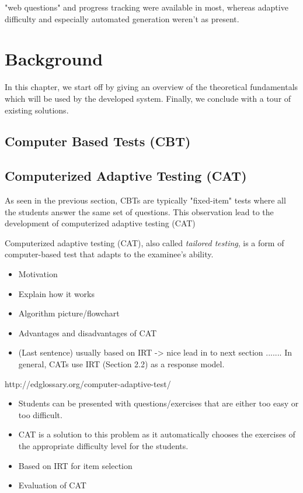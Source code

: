 \documentclass[11pt,a4paper]{report}
\begin{document}
 
"web questions" and progress tracking were available in most, whereas adaptive difficulty and especially automated generation weren't as present. 



\chapter{Background}
In this chapter, we start off by giving an overview of the theoretical fundamentals which will be used by the developed system. Finally, we conclude with a tour of existing solutions.

\section{Computer Based Tests (CBT)}

\section{Computerized Adaptive Testing (CAT)}
As seen in the previous section, CBTs are typically "fixed-item" tests where all the students answer the same set of questions.  This observation lead to the development of computerized adaptive testing (CAT)

Computerized adaptive testing (CAT), also called \textit{tailored testing}, is a form of computer-based test that adapts to the examinee's ability.

\begin{itemize}
\item Motivation
\item Explain how it works
\item Algorithm picture/flowchart
\item Advantages and disadvantages of CAT
\item (Last sentence) usually based on IRT -> nice lead in to next section ....... In general, CATs use IRT (Section 2.2) as a response model.
\end{itemize}

http://edglossary.org/computer-adaptive-test/
\begin{itemize}
\item Students can be presented with questions/exercises that are either too easy or too difficult.
\item CAT is a solution to this problem as it automatically chooses the exercises of the appropriate difficulty level for the students.
\item Based on IRT for item selection
\item Evaluation of CAT
\end{itemize}
\end{document}
